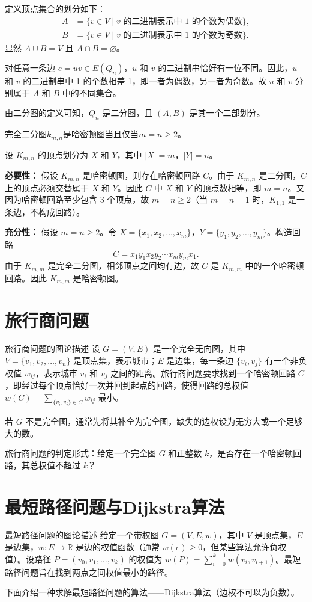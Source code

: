 \documentclass[lang=cn,11pt]{elegantbook}
\begin{document}
    定义顶点集合的划分如下：
    \begin{align*}
    A &= \{ v \in V \mid v \text{ 的二进制表示中 1 的个数为偶数} \}, \\
    B &= \{ v \in V \mid v \text{ 的二进制表示中 1 的个数为奇数} \}.
    \end{align*}
    显然 $A \cup B = V$ 且 $A \cap B = \varnothing$。

    对任意一条边 $e = uv \in E(Q_n)$，$u$ 和 $v$ 的二进制串恰好有一位不同。因此，$u$ 和 $v$ 的二进制串中 1 的个数相差 1，即一者为偶数，另一者为奇数。故 $u$ 和 $v$ 分别属于 $A$ 和 $B$ 中的不同集合。

    由二分图的定义可知，$Q_n$ 是二分图，且 $(A, B)$ 是其一个二部划分。
\begin{theorem}
    完全二分图$k_{m,n}$是哈密顿图当且仅当$m=n\geqslant 2$。
\end{theorem}
设 $K_{m,n}$ 的顶点划分为 $X$ 和 $Y$，其中 $|X| = m$，$|Y| = n$。

    \textbf{必要性：} 假设 $K_{m,n}$ 是哈密顿图，则存在哈密顿回路 $C$。由于 $K_{m,n}$ 是二分图，$C$ 上的顶点必须交替属于 $X$ 和 $Y$。因此 $C$ 中 $X$ 和 $Y$ 的顶点数相等，即 $m = n$。又因为哈密顿回路至少包含 3 个顶点，故 $m = n \ge 2$（当 $m=n=1$ 时，$K_{1,1}$ 是一条边，不构成回路）。

    \textbf{充分性：} 假设 $m = n \ge 2$。令 $X = \{x_1, x_2, \dots, x_m\}$，$Y = \{y_1, y_2, \dots, y_m\}$。构造回路
    \[
    C = x_1 y_1 x_2 y_2 \cdots x_m y_m x_1.
    \]
    由于 $K_{m,m}$ 是完全二分图，相邻顶点之间均有边，故 $C$ 是 $K_{m,m}$ 中的一个哈密顿回路。因此 $K_{m,m}$ 是哈密顿图。
\section{旅行商问题}
\begin{definition}{旅行商问题的图论描述}
设 $G=(V,E)$ 是一个完全无向图，其中 $V=\{v_1,v_2,\ldots,v_n\}$ 是顶点集，表示城市；$E$ 是边集，每一条边 $\{v_i,v_j\}$ 有一个非负权值 $w_{ij}$，表示城市 $v_i$ 和 $v_j$ 之间的距离。旅行商问题要求找到一个哈密顿回路 $C$，即经过每个顶点恰好一次并回到起点的回路，使得回路的总权值 $\displaystyle w(C)=\sum_{\{v_i,v_j\}\in C} w_{ij}$ 最小。

若 $G$ 不是完全图，通常先将其补全为完全图，缺失的边权设为无穷大或一个足够大的数。

旅行商问题的判定形式：给定一个完全图 $G$ 和正整数 $k$，是否存在一个哈密顿回路，其总权值不超过 $k$？
\end{definition}
\section{最短路径问题与Dijkstra算法}
\begin{definition}{最短路径问题的图论描述}
    给定一个带权图 $G=(V,E,w)$，其中 $V$ 是顶点集，$E$ 是边集，$w: E \to \mathbb{R}$ 是边的权值函数（通常 $w(e) \geqslant 0$，但某些算法允许负权值）。设路径 $P = (v_0, v_1, \ldots, v_k)$ 的权值为 $w(P) =\displaystyle \sum_{i=0}^{k-1} w(v_i, v_{i+1})$。最短路径问题旨在找到两点之间权值最小的路径。
\end{definition}
下面介绍一种求解最短路径问题的算法——Dijkstra算法（边权不可以为负数）。
\end{document}
